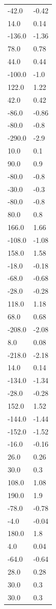 \begin{longtable}{ll}
-42.0 & -0.42 \\
14.0 & 0.14 \\
-136.0 & -1.36 \\
78.0 & 0.78 \\
44.0 & 0.44 \\
-100.0 & -1.0 \\
122.0 & 1.22 \\
42.0 & 0.42 \\
-86.0 & -0.86 \\
-80.0 & -0.8 \\
-290.0 & -2.9 \\
10.0 & 0.1 \\
90.0 & 0.9 \\
-80.0 & -0.8 \\
-30.0 & -0.3 \\
-80.0 & -0.8 \\
80.0 & 0.8 \\
166.0 & 1.66 \\
-108.0 & -1.08 \\
158.0 & 1.58 \\
-18.0 & -0.18 \\
-68.0 & -0.68 \\
-28.0 & -0.28 \\
118.0 & 1.18 \\
68.0 & 0.68 \\
-208.0 & -2.08 \\
8.0 & 0.08 \\
-218.0 & -2.18 \\
14.0 & 0.14 \\
-134.0 & -1.34 \\
-28.0 & -0.28 \\
152.0 & 1.52 \\
-144.0 & -1.44 \\
-152.0 & -1.52 \\
-16.0 & -0.16 \\
26.0 & 0.26 \\
30.0 & 0.3 \\
108.0 & 1.08 \\
190.0 & 1.9 \\
-78.0 & -0.78 \\
-4.0 & -0.04 \\
180.0 & 1.8 \\
4.0 & 0.04 \\
-64.0 & -0.64 \\
28.0 & 0.28 \\
30.0 & 0.3 \\
30.0 & 0.3 \\

\end{longtable}
